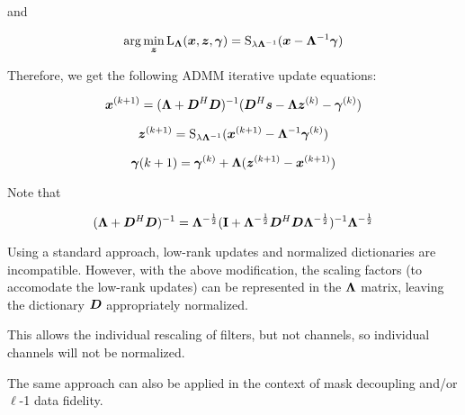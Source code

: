 \documentclass{article}
\begin{document}
and

\begin{equation}
\arg\min_{\bm{z}} \operatorname{L}_{\bm{\Lambda}}(\bm{x},\bm{z},\bm{\gamma}) = \operatorname{S}_{\lambda\bm{\Lambda}^{-1}}(\bm{x} - \bm{\Lambda}^{-1}\bm{\gamma})
\end{equation}

Therefore, we get the following ADMM iterative update equations:


\begin{equation}
\bm{x}^{(k + 1)} = (\bm{\Lambda} + \bm{D}^H\bm{D})^{-1}(\bm{D}^H\bm{s} - \bm{\Lambda}\bm{z}^{(k)} - \bm{\gamma}^{(k)})
\end{equation}

\begin{equation}
\bm{z}^{(k + 1)} = \operatorname{S}_{\lambda\bm{\Lambda}^{-1}}(\bm{x}^{(k + 1)} - \bm{\Lambda}^{-1}\bm{\gamma}^{(k)})
\end{equation}

\begin{equation}
\bm{\gamma}{(k + 1)} = \bm{\gamma}^{(k)} + \bm{\Lambda}(\bm{z}^{(k + 1)} - \bm{x}^{(k + 1)})
\end{equation}


Note that

\begin{equation}
(\bm{\Lambda} + \bm{D}^H\bm{D})^{-1} = \bm{\Lambda}^{-\frac{1}{2}}({\bf I} + \bm{\Lambda}^{-\frac{1}{2}}\bm{D}^H\bm{D}\bm{\Lambda}^{-\frac{1}{2}})^{-1}\bm{\Lambda}^{-\frac{1}{2}}
\end{equation}

Using a standard approach, low-rank updates and normalized dictionaries are incompatible. However, with the above modification, the scaling factors (to accomodate the low-rank updates) can be represented in the $\bm{\Lambda}$ matrix, leaving the dictionary $\bm{D}$ appropriately normalized.

This allows the individual rescaling of filters, but not channels, so individual channels will not be normalized.

The same approach can also be applied in the context of mask decoupling and/or $\ell$-1 data fidelity.
\end{document}
